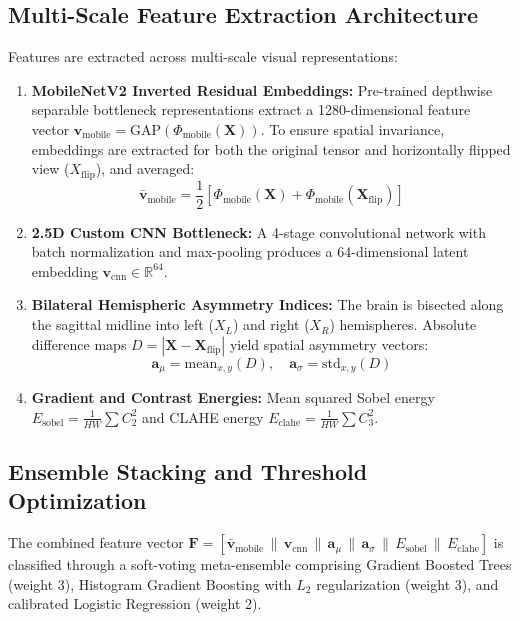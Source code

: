 \documentclass[conference]{IEEEtran}
\begin{document}
\subsection{Multi-Scale Feature Extraction Architecture}
Features are extracted across multi-scale visual representations:
\begin{enumerate}
    \item \textbf{MobileNetV2 Inverted Residual Embeddings:} Pre-trained depthwise separable bottleneck representations extract a 1280-dimensional feature vector $\mathbf{v}_{\text{mobile}} = \text{GAP}(\Phi_{\text{mobile}}(\mathbf{X}))$. To ensure spatial invariance, embeddings are extracted for both the original tensor and horizontally flipped view ($X_{\text{flip}}$), and averaged:
    \begin{equation}
    \bar{\mathbf{v}}_{\text{mobile}} = \frac{1}{2}\left[\Phi_{\text{mobile}}(\mathbf{X}) + \Phi_{\text{mobile}}(\mathbf{X}_{\text{flip}})\right]
    \end{equation}
    \item \textbf{2.5D Custom CNN Bottleneck:} A 4-stage convolutional network with batch normalization and max-pooling produces a 64-dimensional latent embedding $\mathbf{v}_{\text{cnn}} \in \mathbb{R}^{64}$.
    \item \textbf{Bilateral Hemispheric Asymmetry Indices:} The brain is bisected along the sagittal midline into left ($X_L$) and right ($X_R$) hemispheres. Absolute difference maps $D = |\mathbf{X} - \mathbf{X}_{\text{flip}}|$ yield spatial asymmetry vectors:
    \begin{equation}
    \mathbf{a}_{\mu} = \text{mean}_{x,y}(D), \quad \mathbf{a}_{\sigma} = \text{std}_{x,y}(D)
    \end{equation}
    \item \textbf{Gradient and Contrast Energies:} Mean squared Sobel energy $E_{\text{sobel}} = \frac{1}{HW}\sum C_2^2$ and CLAHE energy $E_{\text{clahe}} = \frac{1}{HW}\sum C_3^2$.
\end{enumerate}

\subsection{Ensemble Stacking and Threshold Optimization}
The combined feature vector $\mathbf{F} = [\bar{\mathbf{v}}_{\text{mobile}} \,\|\, \mathbf{v}_{\text{cnn}} \,\|\, \mathbf{a}_{\mu} \,\|\, \mathbf{a}_{\sigma} \,\|\, E_{\text{sobel}} \,\|\, E_{\text{clahe}}]$ is classified through a soft-voting meta-ensemble comprising Gradient Boosted Trees (weight 3), Histogram Gradient Boosting with $L_2$ regularization (weight 3), and calibrated Logistic Regression (weight 2).
\end{document}
